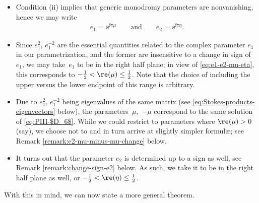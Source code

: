\begin{itemize}\itemsep=0pt
 \item Condition (ii) implies that generic monodromy parameters are nonvanishing, hence we may write
 \begin{gather}
 e_1=\ee^{\ii\pi\mu}\qquad \text{and}\qquad e_2=\ee^{\ii\pi\eta}. \label{eq:e1-e2-mu-eta}
 \end{gather}
 \item Since $e_1^2$, $e_1^{-2}$ are the essential quantities related to the complex parameter $e_1$ in our parametrization, and the former are insensitive to a change in sign of $e_1$, we may take~$e_1$ to be in the right half plane; in view of \eqref{eq:e1-e2-mu-eta}, this corresponds to $-\frac12 < \re(\mu) \leq \frac12$. Note that the choice of including the upper versus the lower endpoint of this range is arbitrary.
 \item Due to $e_1^2$, $e_1^{-2}$ being eigenvalues of the same matrix (see \eqref{eq:Stokes-products-eigenvectors} below), the parameters~$\mu$,~$-\mu$ correspond to the same solution of \eqref{eq:PIII-$D_6$}. While we could restrict to parameters where $\re(\mu) >0$ (say), we choose not to and in turn arrive at slightly simpler formul\ae; see Remark \ref{remark:e2-mu-minus-mu-change} below.
 \item It turns out that the parameter $e_2$ is determined up to a sign as well, see Remark \ref{remark:change-sign-e2} below. As such, we take it to be in the right half plane as well, or $-\frac12 < \re(\eta) \leq \frac12$.
\end{itemize}
With this in mind, we can now state a more general theorem.
